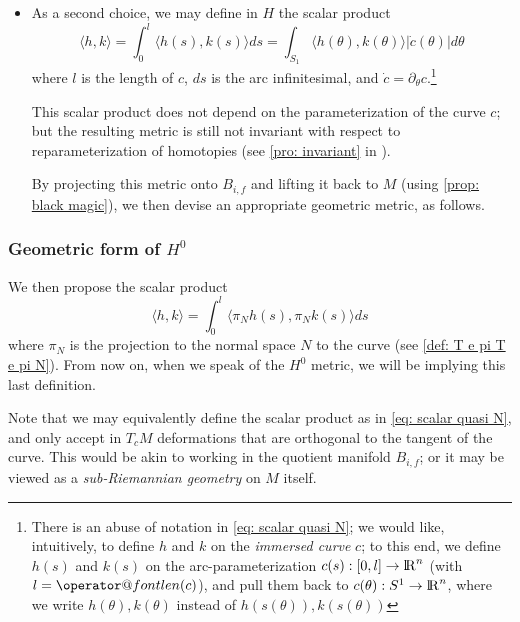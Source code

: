 \documentclass[twoside,a4paper,english]{article}
\makeatletter
\def\derpar#1{\partial_{#1}}
\def\len{\mathop{\operator@font len}\nolimits}
\makeatother
\begin{document}
\begin{itemize}
  $E_s(C)$ is strongly continuous in $H^{1,0}$ and is convex,
  and $E_s(C)$ is coercive (proof by using \ref{poincare}).
  So  $E_s$ has a very simple unique minimal geodesic,
  namely, the pointwise linear interpolation
  $$C^*(\theta,v)= (1-v) c_0(\theta)+v c_1(\theta)$$

\item
  As a second choice, we may define in $H$  the scalar product
  \begin{equation}
    \langle h,k\rangle = \int_0^l \langle h(s),k(s)\rangle  ds
    = \int_{S_1} \langle h(\theta),k(\theta)\rangle
    |\dot c(\theta) |d\theta \label{eq: scalar quasi N}
  \end{equation}
  where $l$ is the length of $c$, $ds$ is the arc infinitesimal, and
  $\dot c=\derpar\theta c$.\footnote{There is an abuse of
    notation in \eqref{eq: scalar quasi N}; we would like,
    intuitively, to define $h$ and $k$ on the \emph{immersed curve}
    $c$; to this end, we define $h(s)$ and $k(s)$ on the arc-parameterization
    $c(s):[0,l]\to{\protect\mathrm{l\hskip-0.15em R}}^n$ (with $l=\len(c)$), and pull them back to
    $c(\theta):S^1\to{\protect\mathrm{l\hskip-0.15em R}}^n$, where we write  $h(\theta),k(\theta)$
    instead of $h(s(\theta)),k(s(\theta))$ 
  }

  This scalar product does not depend on the parameterization of the curve $c$;
  but the resulting metric is still not invariant with respect to
  reparameterization of homotopies
  (see \ref{pro: invariant} in \pageref{pro: invariant}).

  By projecting this metric onto $B_{i,f}$ and lifting it back to 
  $M$ (using   \ref{prop: black magic}),
  we then devise an appropriate geometric metric, as follows.
\end{itemize}

\subsubsection{Geometric form of $H^0$}

  We then propose the scalar product
  \begin{equation}
    \langle h,k\rangle = \int_0^l \langle \pi_N h(s),\pi_N k(s)\rangle  ds
    \label{eq:H0}    
  \end{equation}
  where $\pi_N$ is the projection to the normal space $N$ to the curve
  (see \ref{def: T e pi T e pi N}).
  From now on, when we speak of the $H^0$ metric, we will be 
  implying this last definition.  

  Note that we may equivalently define the scalar product as in 
  \eqref{eq: scalar quasi N}, and only accept in $T_cM$ deformations
  that are orthogonal to the tangent of the curve. This would
  be akin to working in the quotient manifold $B_{i,f}$; or it may
  be viewed as a \emph{sub-Riemannian geometry} on $M$ itself.
\end{document}
